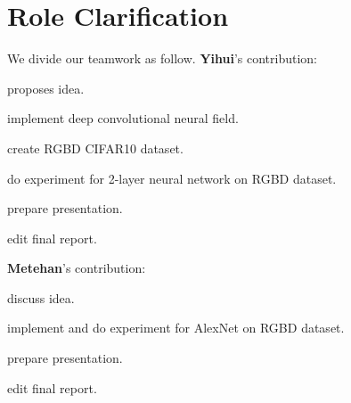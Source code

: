 \documentclass[10pt,twocolumn,letterpaper]{article}
\begin{document}
\section*{Role Clarification}
We divide our teamwork as follow. {\bf Yihui}'s contribution:
\begin{enumerate*}
\item proposes idea. 
\item implement deep convolutional neural field. 
\item create RGBD CIFAR10 dataset. 
\item do experiment for 2-layer neural network on RGBD dataset.
\item prepare presentation.
\item edit final report.
\end{enumerate*}
{\bf Metehan}'s contribution:
\begin{enumerate*}
\item discuss idea.
\item implement and do experiment for AlexNet on RGBD dataset. 
\item prepare presentation. 
\item edit final report.
\end{enumerate*}

{\small
\printbibliography
}
\end{document}
